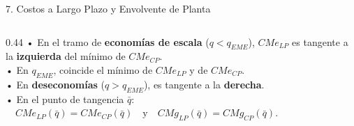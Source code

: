 \documentclass[aspectratio=169, 10pt]{beamer}
\begin{document}
\begin{frame}{7. Costos a Largo Plazo y Envolvente de Planta}
\begin{columns}[T]
    \begin{column}{0.44\textwidth}
      {\scriptsize
        • En el tramo de \textbf{economías de escala} (\(q < q_{EME}\)), \(CMe_{LP}\) es tangente a la \textbf{izquierda} del mínimo de \(CMe_{CP}\).\\
        • En \(q_{EME}\), coincide el mínimo de \(CMe_{LP}\) y de \(CMe_{CP}\).\\
        • En \textbf{deseconomías} (\(q > q_{EME}\)), es tangente a la \textbf{derecha}.\\[5pt]
      }
      {\scriptsize
        • En el punto de tangencia \(\bar{q}\):\\
        \(\quad CMe_{LP}(\bar{q}) = CMe_{CP}(\bar{q}) \quad \text{y} \quad CMg_{LP}(\bar{q}) = CMg_{CP}(\bar{q})\).
      }
    \end{column}
  \end{columns}

\end{frame}
\end{document}
